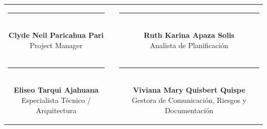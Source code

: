 \documentclass[11pt,a4paper]{article}
\begin{document}
\vspace{1.5cm}
\begin{center}
\begin{tabular}{c c c}
    \parbox{6.5cm}{\centering \rule{6.0cm}{0.6pt}\\[5pt] \textbf{Clyde Neil Paricahua Pari}\\[2pt] {\footnotesize Project Manager}}
    & \hspace{0.8cm} &
    \parbox{6.5cm}{\centering \rule{6.0cm}{0.6pt}\\[5pt] \textbf{Ruth Karina Apaza Solis}\\[2pt] {\footnotesize Analista de Planificación}}
    \\[2.0cm]
    \parbox{6.5cm}{\centering \rule{6.0cm}{0.6pt}\\[5pt] \textbf{Eliseo Tarqui Ajahuana}\\[2pt] {\footnotesize Especialista Técnico / Arquitectura}}
    & \hspace{0.8cm} &
    \parbox{6.5cm}{\centering \rule{6.0cm}{0.6pt}\\[5pt] \textbf{Viviana Mary Quisbert Quispe}\\[2pt] {\footnotesize Gestora de Comunicación, Riesgos y Documentación}}
\end{tabular}
\end{center}
\end{document}
